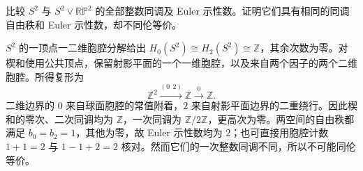 \begin{exercise}\label{g2:ex:insufficient-euler-check}
	比较 \(S^2\) 与 \(S^2\vee\mathbb{RP}^2\) 的全部整数同调及 Euler 示性数。证明它们具有相同的同调自由秩和 Euler 示性数，却不同伦等价。
\end{exercise}
\begin{solution}
	\(S^2\) 的一顶点一二维胞腔分解给出 \(H_0(S^2)\cong H_2(S^2)\cong\mathbb Z\)，其余次数为零。对楔和使用公共顶点，保留射影平面的一个一维胞腔，以及来自两个因子的两个二维胞腔。所得复形为
	\[
		\mathbb Z^2\xrightarrow{(0\ \ 2)}\mathbb Z\xrightarrow{0}\mathbb Z.
	\]
	二维边界的 \(0\) 来自球面胞腔的常值附着，\(2\) 来自射影平面边界的二重绕行。因此楔和的零次、二次同调均为 \(\mathbb Z\)，一次同调为 \(\mathbb Z/2\mathbb Z\)，更高次为零。两空间的自由秩都满足 \(b_0=b_2=1\)，其他为零，故 Euler 示性数均为 \(2\)；也可直接用胞腔计数 \(1+1=2\) 与 \(1-1+2=2\) 核对。然而它们的一次整数同调不同，所以不可能同伦等价。
\end{solution}
